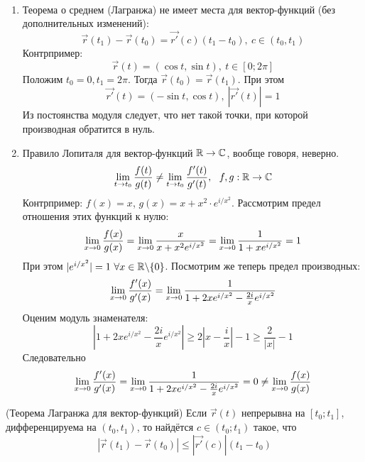 \begin{note}~
\begin{enumerate}
	\item Теорема о среднем (Лагранжа) не имеет места для вектор-функций (без дополнительных изменений):
	\[
		\vec{r}(t_1) - \vec{r}(t_0) = \vec{r'}(c)(t_1 - t_0),\ c \in (t_0, t_1)
	\]
	Контрпример:
	\[
		\vec{r}(t) = (\cos t, \sin t),\ t \in [0; 2\pi]
	\]
	Положим $t_0 = 0, t_1 = 2\pi$. Тогда $\vec{r}(t_0) = \vec{r}(t_1)$. При этом
	\[
		\vec{r'}(t) = (-\sin t, \cos t),\ |\vec{r'}(t)| = 1
	\]
	Из постоянства модуля следует, что нет такой точки, при которой производная обратится в нуль.
	
	\item Правило Лопиталя для вектор-функций $\mathbb{R} \to \mathbb{C}$, вообще говоря, неверно.
	\[
		\lim\limits_{t \to t_0} \frac{f(t)}{g(t)} \not = \lim\limits_{t \to t_0} \frac{f'(t)}{g'(t)},\ \ f, g: \mathbb{R} \to \mathbb{C}
	\]
	Контрпример: \(f(x) = x\), \(g(x) = x + x^2 \cdot e^{i / x^2}\). Рассмотрим предел отношения этих функций к нулю:
	\[
		\lim\limits_{x \to 0} \frac{f(x)}{g(x)} = \lim\limits_{x \to 0} \frac{x}{x + x^2 e^{i / x^2}} = \lim\limits_{x \to 0} \frac{1}{1 + xe^{i / x^2}} = 1
	\]
	При этом $|e^{i / x^2}| = 1\ \forall x \in \mathbb{R} \backslash \{0\}$. Посмотрим же теперь предел производных:
	\[
		\lim\limits_{x \to 0} \frac{f'(x)}{g'(x)} = \lim\limits_{x \to 0} \frac{1}{1 + 2xe^{i / x^2} - \frac{2i}{x}e^{i / x^2}}
	\]
	Оценим модуль знаменателя:
	\[
		\left|1 + 2xe^{i / x^2} - \frac{2i}{x}e^{i / x^2}\right| \ge 2\left|x - \frac{i}{x}\right| - 1 \ge \frac{2}{|x|} - 1
	\]
	Следовательно
	\[
		\lim\limits_{x \to 0} \frac{f'(x)}{g'(x)} = \lim\limits_{x \to 0} \frac{1}{1 + 2xe^{i / x^2} - \frac{2i}{x}e^{i / x^2}} = 0 \neq \lim\limits_{x \to 0} \frac{f(x)}{g(x)}
	\]
\end{enumerate}
\end{note}

\begin{theorem} (Теорема Лагранжа для вектор-функций)
	Если $\vec{r}(t)$ непрерывна на $[t_0; t_1]$, дифференцируема на $(t_0, t_1)$, то найдётся $c \in (t_0; t_1)$ такое, что
	\[
		|\vec{r}(t_1) - \vec{r}(t_0)| \le |\vec{r'}(c)|(t_1 - t_0)
	\]
\end{theorem}

